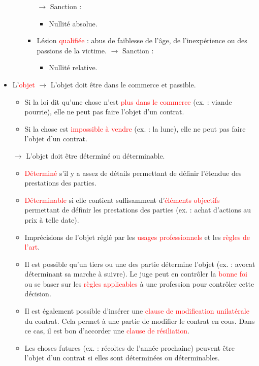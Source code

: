 \begin{itemize}
\begin{itemize}
\begin{itemize}
			$\rightarrow$ Sanction :
			\begin{itemize}
				\item Nullité absolue.
			\end{itemize}
			\item Lésion \textcolor{red}{qualifiée} : abus de faiblesse de l'âge, de l'inexpérience ou des passions de la victime.
			$\rightarrow$ Sanction :
			\begin{itemize}
				\item Nullité relative.
			\end{itemize}
		\end{itemize}
	\end{itemize}
	\item L'\textcolor{red}{objet}
	$\rightarrow$ L'objet doit être dans le commerce et passible.
	\begin{itemize}
		\item Si la loi dit qu'une chose n'est \textcolor{red}{plus dans le commerce} (ex. : viande pourrie), elle ne peut pas faire l'objet d'un contrat.
		\item Si la chose est \textcolor{red}{impossible à vendre} (ex. : la lune), elle ne peut pas faire l'objet d'un contrat.
	\end{itemize}
	$\rightarrow$ L'objet doit être déterminé ou déterminable.
	\begin{itemize}
		\item \textcolor{red}{Déterminé} s'il y a assez de détails permettant de définir l'étendue des prestations des parties.
		\item \textcolor{red}{Déterminable} si elle contient suffisamment d'\textcolor{red}{éléments objectifs} permettant de définir les prestations des parties (ex. : achat d'actions au prix à telle date).
		\item Imprécisions de l'objet réglé par les \textcolor{red}{usages professionnels} et les \textcolor{red}{règles de l'art}.
		\item Il est possible qu'un tiers ou une des partie détermine l'objet (ex. : avocat déterminant sa marche à suivre). Le juge peut en contrôler la \textcolor{red}{bonne foi} ou se baser sur les \textcolor{red}{règles applicables} à une profession pour contrôler cette décision.
		\item Il est également possible d'insérer une \textcolor{red}{clause de modification unilatérale} du contrat. Cela permet à une partie de modifier le contrat en cous. Dans ce cas, il est bon d'accorder une \textcolor{red}{clause de résiliation}.
		\item Les choses futures (ex. : récoltes de l'année prochaine) peuvent être l'objet d'un contrat si elles sont déterminées ou déterminables.

\end{itemize}
\end{itemize}

